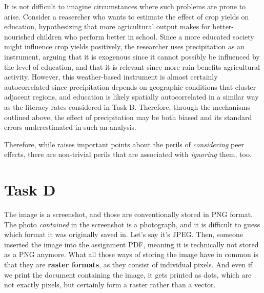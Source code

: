 \documentclass[
  a4paper,
]{article}
\begin{document}
It is not difficult to imagine circumstances where such problems are
prone to arise. Consider a reasercher who wants to estimate the effect
of crop yields on education, hypothesizing that more agricultural output
makes for better-nourished children who perform better in school. Since
a more educated society might influence crop yields positively, the
researcher uses precipitation as an instrument, arguing that it is
exogenous since it cannot possibly be influenced by the level of
education, and that it is relevant since more rain benefits agricultural
activity. However, this weather-based instrument is almost certainly
autocorrelated since precipitation depends on geographic conditions that
cluster adjacent regions, and education is likely spatially
autocorrelated in a similar way as the literacy rates considered in Task
B. Therefore, through the mechanisms outlined above, the effect of
precipitation may be both biased and its standard errors underestimated
in such an analysis.

Therefore, while \textcite{angrist2014} raises important points about
the perils of \emph{considering} peer effects, there are non-trivial
perils that are associated with \emph{ignoring} them, too.

\newpage

\section{Task D}\label{task-d}

The image is a screenshot, and those are conventionally stored in PNG
format. The photo \emph{contained} in the screenshot is a photograph,
and it is difficult to guess which format it was originally saved in.
Let's say it's JPEG. Then, someone inserted the image into the
assignment PDF, meaning it is technically not stored as a PNG anymore.
What all those ways of storing the image have in common is that they are
\textbf{raster formats}, as they consist of individual pixels. And even
if we print the document containing the image, it gets printed as dots,
which are not exactly pixels, but certainly form a raster rather than a
vector.

\newpage

\printbibliography
\end{document}
